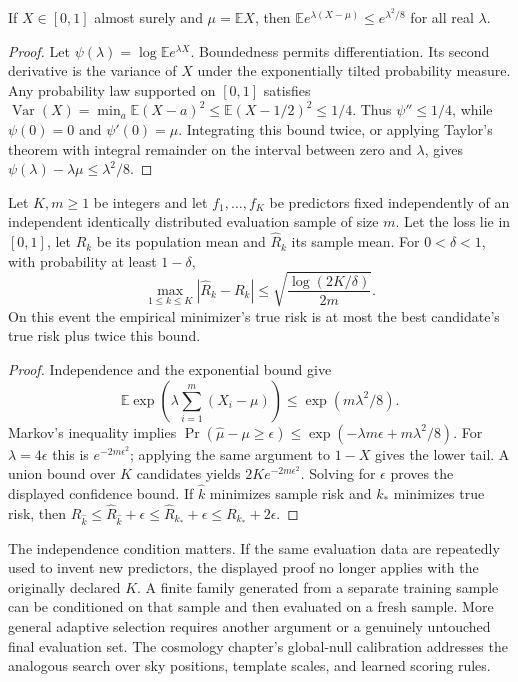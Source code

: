 \begin{lemma}
If $X\in[0,1]$ almost surely and $\mu=\mathbb EX$, then
$\mathbb E e^{\lambda(X-\mu)}\le e^{\lambda^2/8}$ for all real $\lambda$.
\end{lemma}
\begin{proof}
Let $\psi(\lambda)=\log\mathbb Ee^{\lambda X}$. Boundedness permits differentiation. Its second derivative is the variance of $X$ under the exponentially tilted probability measure. Any probability law supported on $[0,1]$ satisfies
$\operatorname{Var}(X)=\min_a\mathbb E(X-a)^2\le\mathbb E(X-1/2)^2\le1/4$.
Thus $\psi''\le1/4$, while $\psi(0)=0$ and $\psi'(0)=\mu$. Integrating this bound twice, or applying Taylor's theorem with integral remainder on the interval between zero and $\lambda$, gives
$\psi(\lambda)-\lambda\mu\le\lambda^2/8$.
\end{proof}

\begin{theorem}
Let $K,m\ge1$ be integers and let $f_1,\ldots,f_K$ be predictors fixed independently of an independent identically distributed evaluation sample of size $m$. Let the loss lie in $[0,1]$, let $R_k$ be its population mean and $\widehat R_k$ its sample mean. For $0<\delta<1$, with probability at least $1-\delta$,
\[
 \max_{1\le k\le K}|\widehat R_k-R_k|
 \le \sqrt{\frac{\log(2K/\delta)}{2m}}.
\]
On this event the empirical minimizer's true risk is at most the best candidate's true risk plus twice this bound.
\end{theorem}
\begin{proof}
Independence and the exponential bound give
\[
 \mathbb E\exp\!\left(\lambda\sum_{i=1}^m(X_i-\mu)\right)
 \le\exp(m\lambda^2/8).
\]
Markov's inequality implies
$\Pr(\widehat\mu-\mu\ge\epsilon)\le\exp(-\lambda m\epsilon+m\lambda^2/8)$.
For $\lambda=4\epsilon$ this is $e^{-2m\epsilon^2}$; applying the same argument to $1-X$ gives the lower tail. A union bound over $K$ candidates yields $2K e^{-2m\epsilon^2}$. Solving for $\epsilon$ proves the displayed confidence bound. If $\hat k$ minimizes sample risk and $k_*$ minimizes true risk, then
$R_{\hat k}\le\widehat R_{\hat k}+\epsilon
\le\widehat R_{k_*}+\epsilon\le R_{k_*}+2\epsilon$.
\end{proof}

The independence condition matters. If the same evaluation data are repeatedly used to invent new predictors, the displayed proof no longer applies with the originally declared $K$. A finite family generated from a separate training sample can be conditioned on that sample and then evaluated on a fresh sample. More general adaptive selection requires another argument or a genuinely untouched final evaluation set. The cosmology chapter's global-null calibration addresses the analogous search over sky positions, template scales, and learned scoring rules.

